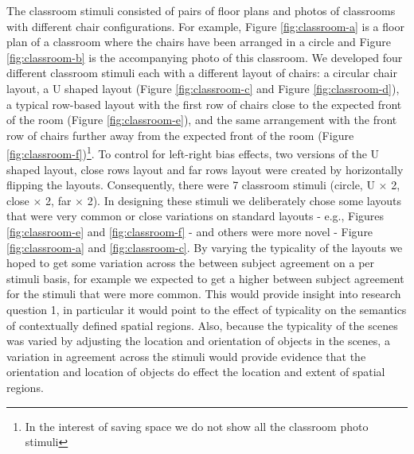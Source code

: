 \documentclass[11pt,letterpaper]{article}
\begin{document}
The classroom stimuli consisted of pairs of floor plans and photos of classrooms with different chair configurations. For example, Figure \ref{fig:classroom-a} is a floor plan of a classroom where the chairs have been arranged in a circle and Figure \ref{fig:classroom-b} is the accompanying photo of this classroom. We developed four different classroom stimuli each with a different layout of chairs: a circular chair layout, a U shaped layout (Figure \ref{fig:classroom-c} and Figure \ref{fig:classroom-d}), a typical row-based layout with the first row of chairs close to the expected front of the room (Figure \ref{fig:classroom-e}), and the same arrangement with the front row of chairs further away from the expected front of the room (Figure \ref{fig:classroom-f})\footnote{In the interest of saving space we do not show all the classroom photo stimuli}. To control for left-right bias effects, two versions of the U shaped layout, close rows layout and far rows layout were created by horizontally flipping the layouts. Consequently, there were 7 classroom stimuli (circle, U $\times$ 2, close $\times$ 2, far $\times$ 2). In designing these stimuli we deliberately chose some layouts that were very common or close variations on standard layouts - e.g., Figures \ref{fig:classroom-e} and \ref{fig:classroom-f} - and others were more novel - Figure \ref{fig:classroom-a} and \ref{fig:classroom-c}. By varying the typicality of the layouts we hoped to get some variation across the between subject agreement on a per stimuli basis, for example we expected to get a higher between subject agreement for the stimuli that were more common. This would provide insight into research question 1, in particular it would point to the effect of typicality on the semantics of contextually defined spatial regions. Also, because the typicality of the scenes was varied by adjusting the location and orientation of objects in the scenes, a variation in agreement across the stimuli would provide evidence that the orientation and location of objects do effect the location and extent of spatial regions.
\end{document}
